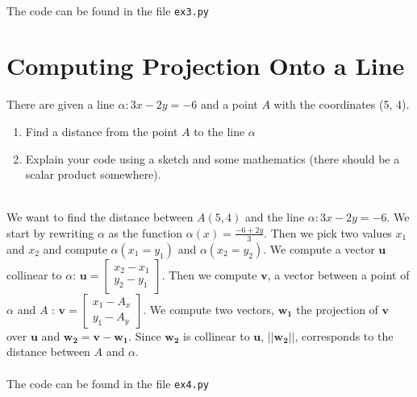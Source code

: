 \documentclass[a4paper]{article}
\begin{document}
\begin{enumerate}
    \hrulefill \\
    The code can be found in the file \texttt{ex3.py}

\end{enumerate}

\clearpage
\section{Computing Projection Onto a Line}
There are given a line $\alpha : 3x - 2y = -6$ and a point $A$ with the coordinates (5, 4).
\begin{enumerate}
    \item Find a distance from the point $A$ to the line $\alpha$
    \item Explain your code using a sketch and some mathematics (there should be a scalar product somewhere).
\end{enumerate}

\hrulefill \\
We want to find the distance between $A(5, 4)$ and the line $\alpha : 3x - 2y = -6$. We start by rewriting $\alpha$ as the function $\alpha (x)=\frac{-6 +2y}{3}$. Then we pick two values $x_{1}$ and $x_{2}$ and compute $\alpha (x_{1}=y_{1})$ and $\alpha (x_{2}=y_{2})$. We compute a vector $\mathbf{u}$ collinear to $\alpha$: $\mathbf{u} = \begin{bmatrix} x_{2} - x_{1}\\y_{2} - y_{1} \end{bmatrix}$. Then we compute $\mathbf{v}$, a vector between a point of $\alpha$ and $A$ : $\mathbf{v} = \begin{bmatrix} x_{1} - A_{x}\\y_{1} - A_{y} \end{bmatrix}$. We compute two vectors, $\mathbf{w_{1}}$ the projection of $\mathbf{v}$ over $\mathbf{u}$ and $\mathbf{w_{2}} = \mathbf{v}-\mathbf{w_{1}}$. Since $\mathbf{w_{2}}$ is collinear to $\mathbf{u}$, $||\mathbf{w_{2}}||$, corresponds to the distance between $A$ and $\alpha$.\\
\\
The code can be found in the file \texttt{ex4.py}


% 
% 
\end{document}
